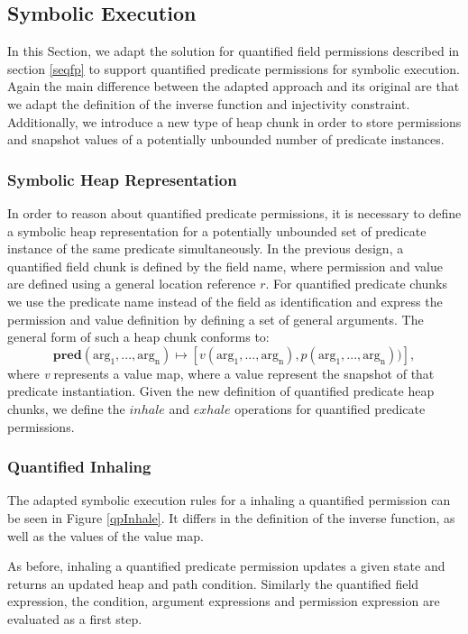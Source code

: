 \documentclass[12pt]{article}
\begin{document}
\subsection{Symbolic Execution}
\label{SymbolicPredicates}
In this Section, we adapt the solution for quantified field permissions described in section \ref{seqfp} to support quantified predicate permissions for symbolic execution. Again the main difference between the adapted approach and its original are that we adapt the definition of the inverse function and injectivity constraint. Additionally, we introduce a new type of heap chunk in order to store permissions and snapshot values of a potentially unbounded number of predicate instances.

\subsubsection{Symbolic Heap Representation} \label{shr}
In order to reason about quantified predicate permissions, it is necessary to define a symbolic heap representation for a potentially unbounded set of predicate instance of the same predicate simultaneously. In the previous design, a quantified field chunk is defined by the field name, where permission and value are defined using a general location reference \(r\).
For quantified predicate chunks we use the predicate name instead of the field as identification and express the permission and value definition by defining a set of general arguments. The general form of such a heap chunk conforms to:
\begin{equation}
	\mathbf{pred}(\mathrm{arg_1, ..., arg_n})\mapsto [v(\mathrm{arg_1, ..., arg_n}), p(\mathrm{arg_1, ..., arg_n}))],
\end{equation}
where \textit{v} represents a value map, where a value represent the snapshot of that predicate instantiation.
Given the new definition of quantified predicate heap chunks, we define the \(inhale\) and \(exhale\) operations for quantified predicate permissions.

\subsubsection{Quantified Inhaling} 
\label{qpInhaleSec}
The adapted symbolic execution rules for a inhaling a quantified permission can be seen in Figure \ref{qpInhale}. It differs in the definition of the inverse function, as well as the values of the value map.

As before, inhaling a quantified predicate permission updates a given state and returns an updated heap and path condition. Similarly the quantified field expression, the condition, argument expressions and permission expression are evaluated as a first step.
\end{document}
